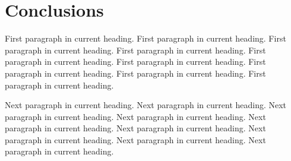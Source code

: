 \chapter{Conclusions}

\noindent   %
First paragraph in current heading. First paragraph in current heading.
First paragraph in current heading. First paragraph in current heading.
First paragraph in current heading. First paragraph in current heading.
First paragraph in current heading. First paragraph in current heading.
First paragraph in current heading.

Next paragraph in current heading. Next paragraph in current heading.
Next paragraph in current heading. Next paragraph in current heading.
Next paragraph in current heading. Next paragraph in current heading.
Next paragraph in current heading. Next paragraph in current heading.
Next paragraph in current heading.





















